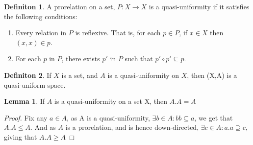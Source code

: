\documentclass[18pt,a4paper]{article}
\theoremstyle{definition}
\newtheorem{definition}{Definiton}[section]
\newtheorem{lemma}{Lemma}[definition]
\begin{document}
\begin{definition} %
	A prorelation on a set, $P:X \to X$ is a quasi-uniformity if it satisfies the following
	conditions:
	\begin{enumerate}[label=(\roman*)]
		\item Every relation in $P$ is reflexive. That is,
			for each $p \in P$, if $x \in X$ then $(x,x) \in p$.
		\item For each $p$ in $P$, there exists $p'$ in $P$ such that
			$p' \circ p' \subseteq p$.
	\end{enumerate}
\end{definition}
\begin{definition} %
	If $X$ is a set, and $A$ is a quasi-uniformity on $X$, then (X,A) is a quasi-uniform space.
\end{definition}
\begin{lemma} If $A$ is a quasi-uniformity on a set X, then $A.A=A$
\end{lemma}
\begin{proof}
	Fix any $a \in A$, as A is a quasi-uniformity, $\exists b \in A: bb \subseteq a$,
	we get that $A.A \leq A$. And as $A$ is a prorelation, and is hence down-directed,
	$\exists c \in A : a.a \supseteq c$, giving that $A.A \geq A$
\end{proof}
\end{document}
